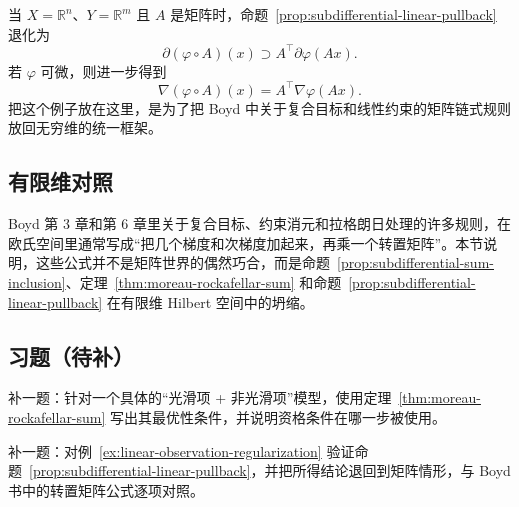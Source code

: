 \begin{example}[有限维复合凸函数]\label{ex:finite-dimensional-composite}
当 $X=\mathbb R^n$、$Y=\mathbb R^m$ 且 $A$ 是矩阵时，命题~\ref{prop:subdifferential-linear-pullback} 退化为
\[
\partial (\varphi\circ A)(x)\supset A^\top \partial \varphi(Ax).
\]
若 $\varphi$ 可微，则进一步得到
\[
\nabla (\varphi\circ A)(x)=A^\top \nabla \varphi(Ax).
\]
把这个例子放在这里，是为了把 Boyd 中关于复合目标和线性约束的矩阵链式规则放回无穷维的统一框架。
\end{example}

\subsection*{有限维对照}

Boyd 第 3 章和第 6 章里关于复合目标、约束消元和拉格朗日处理的许多规则，在欧氏空间里通常写成“把几个梯度和次梯度加起来，再乘一个转置矩阵”。本节说明，这些公式并不是矩阵世界的偶然巧合，而是命题~\ref{prop:subdifferential-sum-inclusion}、定理~\ref{thm:moreau-rockafellar-sum} 和命题~\ref{prop:subdifferential-linear-pullback} 在有限维 Hilbert 空间中的坍缩。

\subsection*{习题（待补）}

\begin{exercise}\label{exr:moreau-rockafellar-placeholder}
补一题：针对一个具体的“光滑项 + 非光滑项”模型，使用定理~\ref{thm:moreau-rockafellar-sum} 写出其最优性条件，并说明资格条件在哪一步被使用。
\end{exercise}

\begin{exercise}[线性拉回桥接题占位]\label{exr:linear-pullback-placeholder}
补一题：对例~\ref{ex:linear-observation-regularization} 验证命题~\ref{prop:subdifferential-linear-pullback}，并把所得结论退回到矩阵情形，与 Boyd 书中的转置矩阵公式逐项对照。
\end{exercise}
